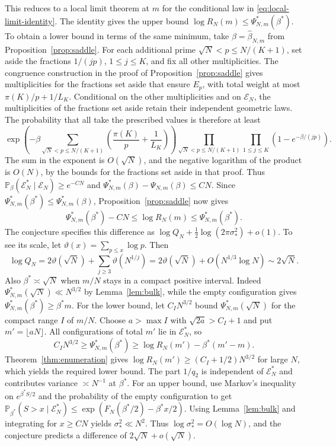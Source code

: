 \documentclass[11pt]{amsart}
\theoremstyle{remark}
\newcommand{\Pp}{\mathbb P}
\begin{document}
This reduces to a local limit theorem at \(m\) for the conditional law
in \eqref{eq:local-limit-identity}. The identity gives the upper bound
\(\log R_N(m)\le\Psi_{N,m}^\ast(\beta^\ast)\). To obtain a lower bound
in terms of the same minimum, take \(\beta=\widehat\beta_{N,m}\)
from Proposition~\ref{prop:saddle}. For each additional prime
\(\sqrt N<p\le N/(K+1)\), set aside the fractions \(1/(jp)\),
\(1\le j\le K\), and fix all other multiplicities. The congruence
construction in the proof of Proposition~\ref{prop:saddle} gives
multiplicities for the fractions set aside that ensure \(E_p\),
with total weight at most \(\pi(K)/p+1/L_K\).
Conditional on the other multiplicities and on \(\mathcal E_N\),
the multiplicities of the fractions set aside retain their independent
geometric laws. The probability that all take the prescribed values
is therefore at least
\[
 \exp\!\left(-\beta\sum_{\sqrt N<p\le N/(K+1)}
                   \left(\frac{\pi(K)}p+\frac1{L_K}\right)\right)
 \prod_{\sqrt N<p\le N/(K+1)}\prod_{1\le j\le K}
                   (1-e^{-\beta/(jp)}).
\]
The sum in the exponent is \(O(\sqrt N)\), and the negative logarithm
of the product is \(O(N)\), by the bounds for the fractions set aside
in that proof. Thus
\(\mathbb P_\beta(\mathcal E_N^\ast\mid\mathcal E_N)\ge e^{-CN}\)
and \(\Psi_{N,m}^\ast(\beta)-\Psi_{N,m}(\beta)\le CN\).
Since \(\Psi_{N,m}^\ast(\beta^\ast)\le\Psi_{N,m}^\ast(\beta)\),
Proposition~\ref{prop:saddle} now gives
\[
 \Psi_{N,m}^\ast(\beta^\ast)-CN\le\log R_N(m)\le\Psi_{N,m}^\ast(\beta^\ast).
\]
The conjecture specifies this difference as \(\log Q_N+\tfrac12\log(2\pi\sigma_\ast^2)+o(1)\).
To see its scale, let \(\vartheta(x)=\sum_{p\le x}\log p\).
Then
\[
 \log Q_N=2\vartheta(\sqrt N)+\sum_{j\ge3}\vartheta(N^{1/j})
         =2\vartheta(\sqrt N)+O(N^{1/3}\log N)
         \sim 2\sqrt N.
\]
Also \(\beta^\ast\asymp\sqrt N\) when \(m/N\) stays in a compact positive
interval. Indeed \(\Psi_{N,m}^\ast(\sqrt N)\ll N^{3/2}\) by
Lemma~\ref{lem:bulk}, while the empty configuration gives
\(\Psi_{N,m}^\ast(\beta^\ast)\ge\beta^\ast m\).
For the lower bound, let \(C_I N^{3/2}\) bound
\(\Psi_{N,m}^\ast(\sqrt N)\) for the compact range \(I\) of \(m/N\).
Choose \(a>\max I\) with \(\sqrt{2a}>C_I+1\) and put
\(m'=\lfloor aN\rfloor\). All configurations of total \(m'\) lie in
\(\mathcal E_N^\ast\), so
\[
 C_I N^{3/2}\ge \Psi_{N,m}^\ast(\beta^\ast)
 \ge \log R_N(m')-\beta^\ast(m'-m).
\]
Theorem~\ref{thm:enumeration} gives \(\log R_N(m')\ge(C_I+1/2)N^{3/2}\)
for large \(N\), which yields the required lower bound.
The part \(1/q_2\) is independent of \(\mathcal E_N^\ast\) and contributes
variance \(\asymp N^{-1}\) at \(\beta^\ast\).
For an upper bound, use Markov's inequality on
\(e^{\beta^\ast S/2}\) and the probability of the empty configuration to get
\(\Pp_{\beta^\ast}(S>x\mid\mathcal E_N^\ast)
 \le \exp(F_N(\beta^\ast/2)-\beta^\ast x/2)\).
Using Lemma~\ref{lem:bulk} and integrating for \(x\ge CN\) yields
\(\sigma_\ast^2\ll N^2\). Thus \(\log \sigma_\ast^2=O(\log N)\), and
the conjecture predicts a difference of \(2\sqrt N+o(\sqrt N)\).
\end{document}
